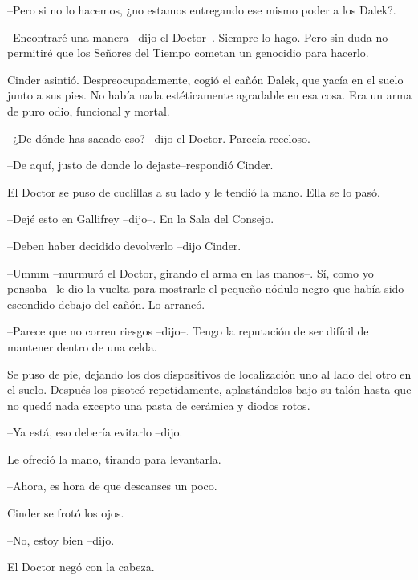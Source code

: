 --Pero si no lo hacemos, ¿no estamos entregando ese mismo poder a los Dalek?.

--Encontraré una manera --dijo el Doctor--. Siempre lo hago. Pero sin duda no permitiré que los Señores del Tiempo cometan un genocidio para hacerlo.



Cinder asintió. Despreocupadamente, cogió el cañón Dalek, que yacía en el suelo junto a sus pies. No había nada estéticamente agradable en esa cosa. Era un arma de puro odio, funcional y mortal.



--¿De dónde has sacado eso? --dijo el Doctor. Parecía receloso.

--De aquí, justo de donde lo dejaste--respondió Cinder.



El Doctor se puso de cuclillas a su lado y le tendió la mano. Ella se lo pasó. 



--Dejé esto en Gallifrey --dijo--. En la Sala del Consejo.

--Deben haber decidido devolverlo --dijo Cinder.

--Ummm --murmuró el Doctor, girando el arma en las manos--. Sí, como yo pensaba --le dio la vuelta para mostrarle el pequeño nódulo negro que había sido escondido debajo del cañón. Lo arrancó.

--Parece que no corren riesgos --dijo--. Tengo la reputación de ser difícil de mantener dentro de una celda.



Se puso de pie, dejando los dos dispositivos de localización uno al lado del otro en el suelo. Después los pisoteó repetidamente, aplastándolos bajo su talón hasta que no quedó nada excepto una pasta de cerámica y diodos rotos. 



--Ya está, eso debería evitarlo --dijo.



Le ofreció la mano, tirando para levantarla. 



--Ahora, es hora de que descanses un poco.



Cinder se frotó los ojos. 



--No, estoy bien --dijo.



El Doctor negó con la cabeza. 



